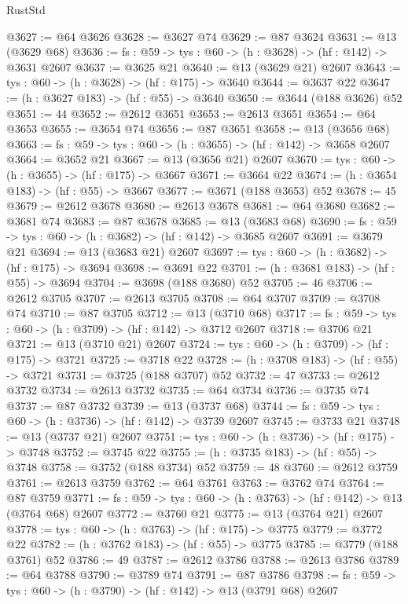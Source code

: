 \begin{lexlean}{RustStd}
\begin{coremodule}
@3627 := @64 @3626
@3628 := @3627 @74
@3629 := @87 @3624
@3631 := @13 (@3629 @68)
@3636 := {fs : @59} -> {tys : @60} -> (h : @3628) -> (hf : @142) -> @3631 @2607
@3637 := @3625 @21
@3640 := @13 (@3629 @21) @2607
@3643 := {tys : @60} -> (h : @3628) -> (hf : @175) -> @3640
@3644 := @3637 @22
@3647 := (h : @3627 @183) -> (hf : @55) -> @3640
@3650 := @3644 (@188 @3626) @52
@3651 := 44
@3652 := @2612 @3651
@3653 := @2613 @3651
@3654 := @64 @3653
@3655 := @3654 @74
@3656 := @87 @3651
@3658 := @13 (@3656 @68)
@3663 := {fs : @59} -> {tys : @60} -> (h : @3655) -> (hf : @142) -> @3658 @2607
@3664 := @3652 @21
@3667 := @13 (@3656 @21) @2607
@3670 := {tys : @60} -> (h : @3655) -> (hf : @175) -> @3667
@3671 := @3664 @22
@3674 := (h : @3654 @183) -> (hf : @55) -> @3667
@3677 := @3671 (@188 @3653) @52
@3678 := 45
@3679 := @2612 @3678
@3680 := @2613 @3678
@3681 := @64 @3680
@3682 := @3681 @74
@3683 := @87 @3678
@3685 := @13 (@3683 @68)
@3690 := {fs : @59} -> {tys : @60} -> (h : @3682) -> (hf : @142) -> @3685 @2607
@3691 := @3679 @21
@3694 := @13 (@3683 @21) @2607
@3697 := {tys : @60} -> (h : @3682) -> (hf : @175) -> @3694
@3698 := @3691 @22
@3701 := (h : @3681 @183) -> (hf : @55) -> @3694
@3704 := @3698 (@188 @3680) @52
@3705 := 46
@3706 := @2612 @3705
@3707 := @2613 @3705
@3708 := @64 @3707
@3709 := @3708 @74
@3710 := @87 @3705
@3712 := @13 (@3710 @68)
@3717 := {fs : @59} -> {tys : @60} -> (h : @3709) -> (hf : @142) -> @3712 @2607
@3718 := @3706 @21
@3721 := @13 (@3710 @21) @2607
@3724 := {tys : @60} -> (h : @3709) -> (hf : @175) -> @3721
@3725 := @3718 @22
@3728 := (h : @3708 @183) -> (hf : @55) -> @3721
@3731 := @3725 (@188 @3707) @52
@3732 := 47
@3733 := @2612 @3732
@3734 := @2613 @3732
@3735 := @64 @3734
@3736 := @3735 @74
@3737 := @87 @3732
@3739 := @13 (@3737 @68)
@3744 := {fs : @59} -> {tys : @60} -> (h : @3736) -> (hf : @142) -> @3739 @2607
@3745 := @3733 @21
@3748 := @13 (@3737 @21) @2607
@3751 := {tys : @60} -> (h : @3736) -> (hf : @175) -> @3748
@3752 := @3745 @22
@3755 := (h : @3735 @183) -> (hf : @55) -> @3748
@3758 := @3752 (@188 @3734) @52
@3759 := 48
@3760 := @2612 @3759
@3761 := @2613 @3759
@3762 := @64 @3761
@3763 := @3762 @74
@3764 := @87 @3759
@3771 := {fs : @59} -> {tys : @60} -> (h : @3763) -> (hf : @142) -> @13 (@3764 @68) @2607
@3772 := @3760 @21
@3775 := @13 (@3764 @21) @2607
@3778 := {tys : @60} -> (h : @3763) -> (hf : @175) -> @3775
@3779 := @3772 @22
@3782 := (h : @3762 @183) -> (hf : @55) -> @3775
@3785 := @3779 (@188 @3761) @52
@3786 := 49
@3787 := @2612 @3786
@3788 := @2613 @3786
@3789 := @64 @3788
@3790 := @3789 @74
@3791 := @87 @3786
@3798 := {fs : @59} -> {tys : @60} -> (h : @3790) -> (hf : @142) -> @13 (@3791 @68) @2607

\end{coremodule}
\end{lexlean}
